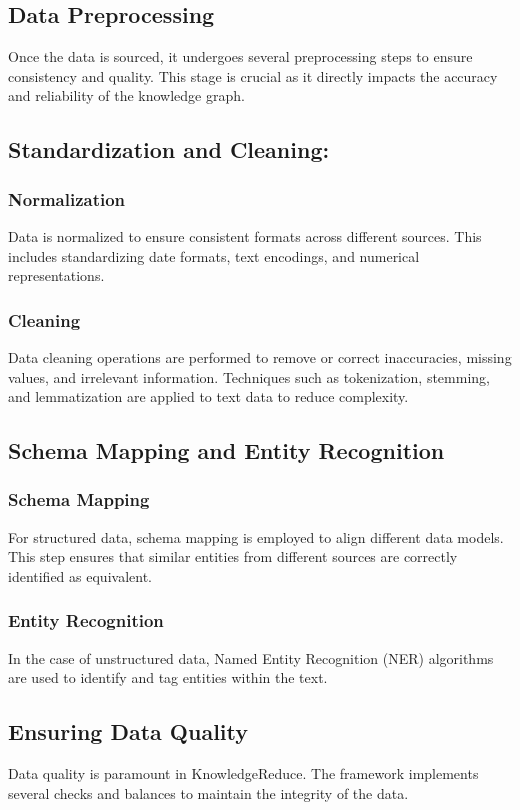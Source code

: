 \documentclass{article}
\begin{document}
\subsection{Data Preprocessing}
Once the data is sourced, it undergoes several preprocessing steps to ensure consistency and quality. This stage is crucial as it directly impacts the accuracy and reliability of the knowledge graph.
\subsection{Standardization and Cleaning:}
\subsubsection{Normalization} 
Data is normalized to ensure consistent formats across different sources. This includes standardizing date formats, text encodings, and numerical representations.
\subsubsection{Cleaning}
Data cleaning operations are performed to remove or correct inaccuracies, missing values, and irrelevant information. Techniques such as tokenization, stemming, and lemmatization are applied to text data to reduce complexity.
\subsection{Schema Mapping and Entity Recognition}
\subsubsection{Schema Mapping}
For structured data, schema mapping is employed to align different data models. This step ensures that similar entities from different sources are correctly identified as equivalent.
\subsubsection{Entity Recognition} 
In the case of unstructured data, Named Entity Recognition (NER) algorithms are used to identify and tag entities within the text.
\subsection{Ensuring Data Quality}
Data quality is paramount in KnowledgeReduce. The framework implements several checks and balances to maintain the integrity of the data.
\end{document}
